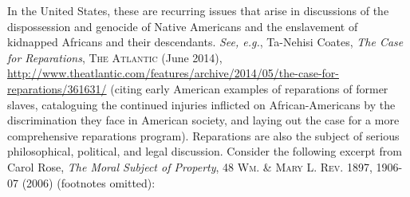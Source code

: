 In the United States, these are recurring issues that arise in discussions of
the dispossession and genocide of Native Americans and the enslavement of
kidnapped Africans and their descendants. \textit{See, e.g.}, Ta-Nehisi Coates,
\textit{The Case for Reparations}, \textsc{The Atlantic} (June 2014),
\url{http://www.theatlantic.com/features/archive/2014/05/the-case-for-reparations/361631/}
(citing early American examples of reparations of former slaves, cataloguing the
continued injuries inflicted on African-Americans by the discrimination they
face in American society, and laying out the case for a more comprehensive
reparations program). Reparations are also the subject of serious philosophical,
political, and legal discussion. Consider the following excerpt from Carol Rose,
\textit{The Moral Subject of Property}, 48 \textsc{Wm. \& Mary L. Rev.} 1897,
1906-07 (2006) (footnotes omitted):

